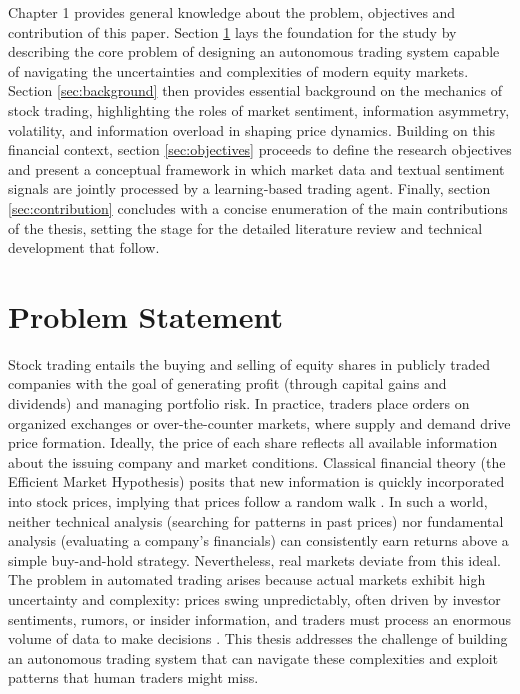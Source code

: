 Chapter 1 provides general knowledge about the problem, objectives and contribution of this paper. Section \ref{sec:problem} lays the foundation for the study by describing the core problem of designing an autonomous trading system capable of navigating the uncertainties and complexities of modern equity markets. Section \ref{sec:background} then provides essential background on the mechanics of stock trading, highlighting the roles of market sentiment, information asymmetry, volatility, and information overload in shaping price dynamics. Building on this financial context, section \ref{sec:objectives}  proceeds to define the research objectives and present a conceptual framework in which market data and textual sentiment signals are jointly processed by a learning‐based trading agent. Finally, section \ref{sec:contribution} concludes with a concise enumeration of the main contributions of the thesis, setting the stage for the detailed literature review and technical development that follow.

\section{Problem Statement}
\label{sec:problem}
Stock trading entails the buying and selling of equity shares in publicly traded companies with the goal of generating profit (through capital gains and dividends) and managing portfolio risk. In practice, traders place orders on organized exchanges or over-the-counter markets, where supply and demand drive price formation. Ideally, the price of each share reflects all available information about the issuing company and market conditions. Classical financial theory (the Efficient Market Hypothesis) posits that new information is quickly incorporated into stock prices, implying that prices follow a random walk \cite{Malkiel2003}. In such a world, neither technical analysis (searching for patterns in past prices) nor fundamental analysis (evaluating a company's financials) can consistently earn returns above a simple buy-and-hold strategy. Nevertheless, real markets deviate from this ideal. The problem in automated trading arises because actual markets exhibit high uncertainty and complexity: prices swing unpredictably, often driven by investor sentiments, rumors, or insider information, and traders must process an enormous volume of data to make decisions \cite{Kyle1985, Malkiel2003, Kahneman2011, Ivashina2011}. This thesis addresses the challenge of building an autonomous trading system that can navigate these complexities and exploit patterns that human traders might miss.

